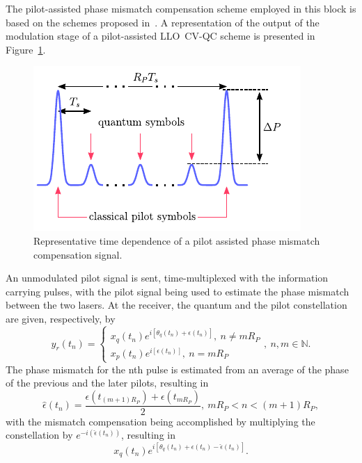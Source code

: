 \begin{refsection}
The pilot-assisted phase mismatch compensation scheme employed in this block is based on the schemes proposed in~\cite{soh15,qi15}. A representation of the output of the modulation stage of a pilot-assisted \mbox{LLO CV-QC} scheme is presented in Figure~\ref{fig:pilotAssistedTimeDependence}. 
%
\begin{figure}[h]
\centering
\includegraphics{./lib/phase_mismatch_compensation/figures/novelMethodTimeDependence.pdf}
\caption{Representative time dependence of a pilot assisted phase mismatch compensation signal.}
\label{fig:pilotAssistedTimeDependence}
\end{figure}
%
An unmodulated pilot signal is sent, time-multiplexed with the information carrying pulses, with the pilot signal being used to estimate the phase mismatch between the two lasers. At the receiver, the quantum and the pilot constellation are given, respectively, by
%
\begin{equation}\label{eq:signalAfterCoherentDetection} 
y_r(t_n)=
\begin{cases}
x_q(t_n)e^{i[\theta_q(t_n)+\epsilon(t_n)]},~n\neq mR_P \\
x_p(t_n)e^{i[\epsilon(t_n)]},~n=mR_P
\end{cases},~n,m\in\mathbb{N}.
\end{equation}
%
The phase mismatch for the nth pulse is estimated from an average of the phase of the previous and the later pilots, resulting in
\begin{equation}
\hat{\epsilon}(t_n)=\frac{\epsilon(t_{(m+1)R_P})+\epsilon(t_{mR_P})}{2},~mR_P<n<(m+1)R_P,
\end{equation}
with the mismatch compensation being accomplished by multiplying the constellation by $e^{-i(\hat{\epsilon}(t_n))}$, resulting in
\begin{equation}
x_q(t_n)e^{i[\theta_q(t_n)+\epsilon(t_n)-\hat{\epsilon}(t_n)]}.
\end{equation}


\end{refsection}

